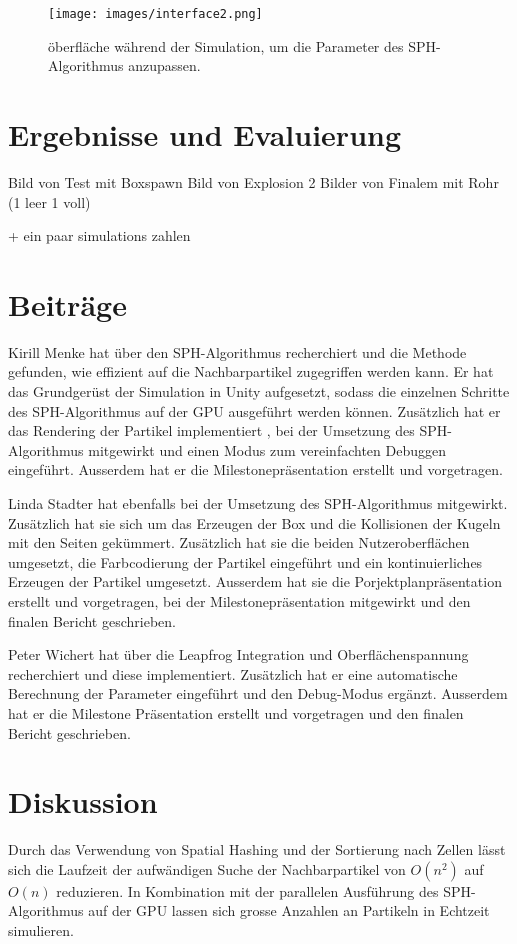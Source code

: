 \documentclass[a4paper]{paper}
\begin{document}
\begin{figure}[t]
    \centering
    \texttt{[image: images/interface2.png]}
    \caption{öberfläche während der Simulation, um die Parameter des SPH-Algorithmus anzupassen.}
    \label{fig:interface2}
\end{figure}

\section{Ergebnisse und Evaluierung}
Bild von Test mit Boxspawn
Bild von Explosion
2 Bilder von Finalem mit Rohr (1 leer 1 voll)

+ ein paar simulations zahlen

\section{Beiträge}
Kirill Menke hat über den SPH-Algorithmus recherchiert und die Methode gefunden, wie 
effizient auf die Nachbarpartikel zugegriffen werden kann. Er hat das Grundgerüst der Simulation in Unity aufgesetzt, sodass die einzelnen Schritte des SPH-Algorithmus auf der GPU ausgeführt werden können. Zusätzlich hat er das Rendering der Partikel implementiert , bei der Umsetzung des SPH-Algorithmus mitgewirkt und einen Modus zum vereinfachten Debuggen eingeführt. Ausserdem hat er die Milestonepräsentation erstellt und vorgetragen. 

Linda Stadter hat ebenfalls bei der Umsetzung des SPH-Algorithmus mitgewirkt. Zusätzlich hat sie sich um das Erzeugen der Box und die Kollisionen der Kugeln mit den Seiten gekümmert. Zusätzlich hat sie die beiden Nutzeroberflächen umgesetzt, die Farbcodierung der Partikel eingeführt und ein kontinuierliches Erzeugen der Partikel umgesetzt. Ausserdem hat sie die Porjektplanpräsentation erstellt und vorgetragen, bei der Milestonepräsentation mitgewirkt und den finalen Bericht geschrieben.

Peter Wichert hat über die Leapfrog Integration und Oberflächenspannung recherchiert und diese implementiert. Zusätzlich hat er eine automatische Berechnung der Parameter eingeführt und den Debug-Modus ergänzt. Ausserdem hat er die Milestone Präsentation erstellt und vorgetragen und den finalen Bericht geschrieben.



\section{Diskussion}
Durch das Verwendung von Spatial Hashing und der Sortierung nach Zellen lässt sich die Laufzeit der aufwändigen Suche der Nachbarpartikel von $O(n^2)$ auf $O(n)$ reduzieren.
In Kombination mit der parallelen Ausführung des SPH-Algorithmus auf der GPU lassen sich grosse Anzahlen an Partikeln in Echtzeit simulieren.
\end{document}
